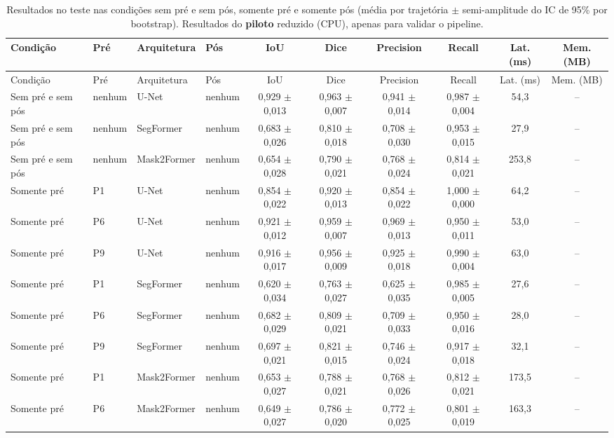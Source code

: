 {\scriptsize\setlength{\tabcolsep}{2.5pt}
\begin{longtable}{llllcccccc}
\caption{Resultados no teste nas condições sem pré e sem pós, somente pré e somente pós (média por trajetória $\pm$ semi-amplitude do IC de 95\% por bootstrap). Resultados do \textbf{piloto} reduzido (CPU), apenas para validar o pipeline.}\label{tab:condicoes123}\\
\toprule
Condição & Pré & Arquitetura & Pós & IoU & Dice & Precision & Recall & Lat. (ms) & Mem. (MB) \\
\midrule
\endfirsthead
\toprule
Condição & Pré & Arquitetura & Pós & IoU & Dice & Precision & Recall & Lat. (ms) & Mem. (MB) \\
\midrule
\endhead
\bottomrule
\endfoot
Sem pré e sem pós & nenhum & U-Net & nenhum & 0,929 $\pm$ 0,013 & 0,963 $\pm$ 0,007 & 0,941 $\pm$ 0,014 & 0,987 $\pm$ 0,004 & 54,3 & -- \\
Sem pré e sem pós & nenhum & SegFormer & nenhum & 0,683 $\pm$ 0,026 & 0,810 $\pm$ 0,018 & 0,708 $\pm$ 0,030 & 0,953 $\pm$ 0,015 & 27,9 & -- \\
Sem pré e sem pós & nenhum & Mask2Former & nenhum & 0,654 $\pm$ 0,028 & 0,790 $\pm$ 0,021 & 0,768 $\pm$ 0,024 & 0,814 $\pm$ 0,021 & 253,8 & -- \\
Somente pré & P1 & U-Net & nenhum & 0,854 $\pm$ 0,022 & 0,920 $\pm$ 0,013 & 0,854 $\pm$ 0,022 & 1,000 $\pm$ 0,000 & 64,2 & -- \\
Somente pré & P6 & U-Net & nenhum & 0,921 $\pm$ 0,012 & 0,959 $\pm$ 0,007 & 0,969 $\pm$ 0,013 & 0,950 $\pm$ 0,011 & 53,0 & -- \\
Somente pré & P9 & U-Net & nenhum & 0,916 $\pm$ 0,017 & 0,956 $\pm$ 0,009 & 0,925 $\pm$ 0,018 & 0,990 $\pm$ 0,004 & 63,0 & -- \\
Somente pré & P1 & SegFormer & nenhum & 0,620 $\pm$ 0,034 & 0,763 $\pm$ 0,027 & 0,625 $\pm$ 0,035 & 0,985 $\pm$ 0,005 & 27,6 & -- \\
Somente pré & P6 & SegFormer & nenhum & 0,682 $\pm$ 0,029 & 0,809 $\pm$ 0,021 & 0,709 $\pm$ 0,033 & 0,950 $\pm$ 0,016 & 28,0 & -- \\
Somente pré & P9 & SegFormer & nenhum & 0,697 $\pm$ 0,021 & 0,821 $\pm$ 0,015 & 0,746 $\pm$ 0,024 & 0,917 $\pm$ 0,018 & 32,1 & -- \\
Somente pré & P1 & Mask2Former & nenhum & 0,653 $\pm$ 0,027 & 0,788 $\pm$ 0,021 & 0,768 $\pm$ 0,026 & 0,812 $\pm$ 0,021 & 173,5 & -- \\
Somente pré & P6 & Mask2Former & nenhum & 0,649 $\pm$ 0,027 & 0,786 $\pm$ 0,020 & 0,772 $\pm$ 0,025 & 0,801 $\pm$ 0,019 & 163,3 & -- \\

\end{longtable}}
